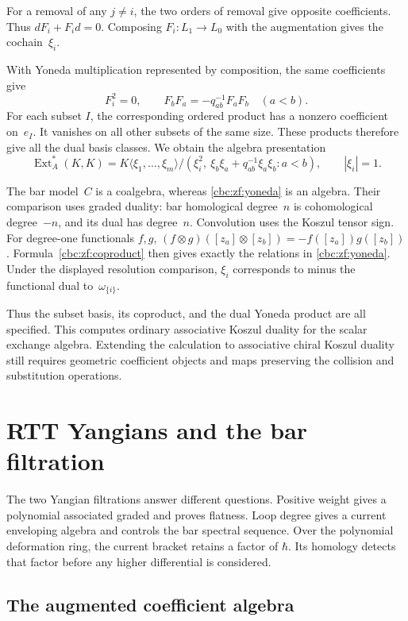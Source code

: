 For a removal of any $j\ne i$, the two orders of removal give opposite
coefficients.  Thus $dF_i+F_id=0$.  Composing $F_i:L_1\to L_0$ with the
augmentation gives the cochain~$\xi_i$.

With Yoneda multiplication represented by composition, the same
coefficients give
\[
 F_i^2=0,\qquad F_bF_a=-q_{ab}^{-1}F_aF_b\quad(a<b).
\]
For each subset $I$, the corresponding ordered product has a nonzero
coefficient on~$e_I$.  It vanishes on all other subsets of the same size.  These products therefore give all the dual basis
classes.  We obtain the algebra presentation
\begin{equation}\label{cbc:zf:yoneda}
 \operatorname{Ext}^{*}_A(K,K)
 =K\langle\xi_1,\ldots,\xi_m\rangle/
       (\xi_i^2,\ \xi_b\xi_a+q_{ab}^{-1}\xi_a\xi_b:a<b),
 \qquad |\xi_i|=1.
\end{equation}

The bar model~$C$ is a coalgebra, whereas
\eqref{cbc:zf:yoneda} is an algebra.  Their comparison uses graded duality:
bar homological degree~$n$ is cohomological degree~$-n$, and its dual
has degree~$n$.  Convolution uses the Koszul tensor sign.  For degree-one
functionals $f,g$, $(f\otimes g)([z_a]\otimes[z_b])=-f([z_a])g([z_b])$.
Formula~\eqref{cbc:zf:coproduct} then gives exactly the relations in
\eqref{cbc:zf:yoneda}.  Under the displayed resolution comparison,
$\xi_i$ corresponds to minus the functional dual to~$\omega_{\{i\}}$.

Thus the subset basis, its coproduct, and the dual Yoneda product are all
specified.  This computes ordinary associative Koszul duality for the
scalar exchange algebra.  Extending the calculation to associative
chiral Koszul duality still requires geometric coefficient objects and
maps preserving the collision and substitution operations.

\chapter{RTT Yangians and the bar filtration}\label{chap:yangian}

The two Yangian filtrations answer different questions.  Positive
weight gives a polynomial associated graded and proves flatness.
Loop degree gives a current enveloping algebra and controls the bar
spectral sequence.  Over the polynomial deformation ring, the current
bracket retains a factor of $\hbar$.  Its homology detects that factor
before any higher differential is considered.

\section{The augmented coefficient algebra}

